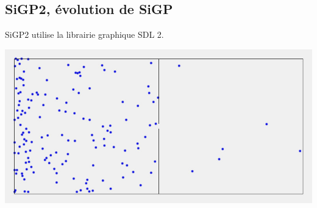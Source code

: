 \subsection{SiGP2, évolution de SiGP}
SiGP2 utilise la librairie graphique SDL 2.
\begin{center}
\includegraphics[scale=0.41]{./illustration/SiGP2}
\end{center}
%
